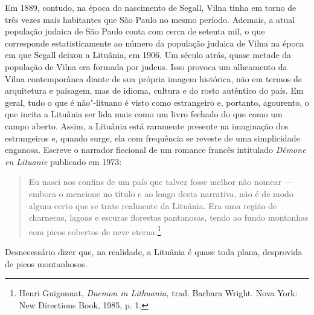 Em 1889, contudo, na
época do nascimento de Segall, Vilna tinha em torno de três vezes mais
habitantes que São Paulo no mesmo período. Ademais, a atual população
judaica de São Paulo conta com cerca de setenta mil, o que corresponde
estatisticamente ao número da população judaica de Vilna na época em que
Segall deixou a Lituânia, em 1906. Um século atrás, quase metade da
população de Vilna era formada por judeus. Isso provoca um alheamento da
Vilna contemporânea diante de sua própria imagem histórica, não em
termos de arquitetura e paisagem, mas de idioma, cultura e do rosto
autêntico do país. Em geral, tudo o que é não"-lituano é visto como
estrangeiro e, portanto, agourento, o que incita a Lituânia ser lida
mais como um livro fechado do que como um campo aberto. Assim, a
Lituânia está raramente presente na imaginação dos estrangeiros e,
quando surge, ela com frequência se reveste de uma simplicidade
enganosa. Escreve o narrador ficcional de um romance
francês intitulado \textit{Démone en Lituanie} publicado em 1973: 

\begin{quote}
Eu nasci nos
confins de um país que talvez fosse melhor não nomear --- embora o
mencione no título e ao longo desta narrativa, não é de modo algum certo
que se trate realmente da Lituânia. Era uma região de charnecas, lagoas
e escuras florestas pantanosas, tendo ao fundo montanhas com picos
cobertos de neve eterna.\footnote{Henri Guigonnat, \textit{Daemon in
  Lithuania,} trad. Barbara Wright. Nova York: New Directions Book,
  1985, p. 1.} 
\end{quote}

Desnecessário dizer que, na realidade, a Lituânia é quase
toda plana, desprovida de picos montanhosos.

